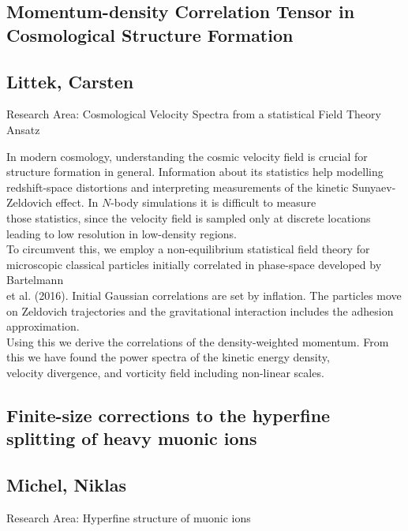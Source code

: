 \subsection*{\centering \large Momentum-density Correlation Tensor in Cosmological Structure Formation}
\subsection*{\centering \normalsize Littek, Carsten}
Research Area: Cosmological Velocity Spectra from a statistical Field Theory Ansatz\newline

\noindent In modern cosmology, understanding the cosmic velocity field is crucial for structure formation in general. Information about its statistics help modelling\\redshift-space distortions and interpreting measurements of the kinetic Sunyaev-Zeldovich effect. In $N$-body simulations it is difficult to measure\\those statistics, since the velocity field is sampled only at discrete locations leading to low resolution in low-density regions.\\To circumvent this, we employ a non-equilibrium statistical field theory for microscopic classical particles initially correlated in phase-space developed by Bartelmann \\et al. (2016). Initial Gaussian correlations are set by inflation. The particles move on Zeldovich trajectories and the gravitational interaction includes the adhesion approximation.\\Using this we derive the correlations of the density-weighted momentum. From this we have found the power spectra of the kinetic energy density,\\velocity divergence, and vorticity field including non-linear scales.

\subsection*{\centering \large Finite-size corrections to the hyperfine splitting of heavy muonic ions}
\subsection*{\centering \normalsize Michel, Niklas}
Research Area: Hyperfine structure of muonic ions\newline

